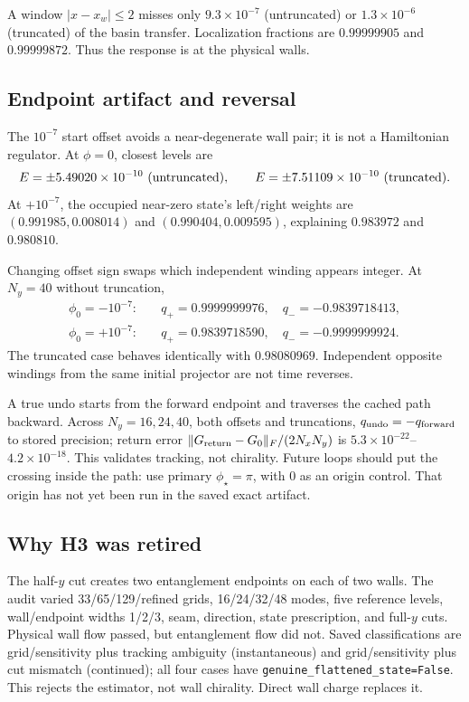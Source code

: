 \documentclass[aps,prb,onecolumn,nofootinbib,superscriptaddress]{revtex4-2}
\newcommand{\code}[1]{\texttt{#1}}
\begin{document}
A window $|x-x_w|\le2$ misses only $9.3\times10^{-7}$ (untruncated) or
$1.3\times10^{-6}$ (truncated) of the basin transfer.  Localization fractions
are $0.99999905$ and $0.99999872$.  Thus the response is at the physical walls.

\subsection{Endpoint artifact and reversal}

The $10^{-7}$ start offset avoids a near-degenerate wall pair; it is not a
Hamiltonian regulator.  At $\phi=0$, closest levels are
\begin{equation}
 E=\pm5.49020\times10^{-10}\ ({\rm untruncated}),\qquad
 E=\pm7.51109\times10^{-10}\ ({\rm truncated}).
\end{equation}
At $+10^{-7}$, the occupied near-zero state's left/right weights are
$(0.991985,0.008014)$ and $(0.990404,0.009595)$, explaining $0.983972$ and
$0.980810$.

Changing offset sign swaps which independent winding appears integer.  At
$N_y=40$ without truncation,
\begin{align}
 \phi_0=-10^{-7}:&\quad q_+=0.9999999976,\quad q_-=-0.9839718413,\\
 \phi_0=+10^{-7}:&\quad q_+=0.9839718590,\quad q_-=-0.9999999924.
\end{align}
The truncated case behaves identically with $0.98080969$.  Independent
opposite windings from the same initial projector are not time reverses.

A true undo starts from the forward endpoint and traverses the cached path
backward.  Across $N_y=16,24,40$, both offsets and truncations,
$q_{\rm undo}=-q_{\rm forward}$ to stored precision; return error
$\|G_{\rm return}-G_0\|_F/(2N_xN_y)$ is
$5.3\times10^{-22}$--$4.2\times10^{-18}$.  This validates tracking, not
chirality.  Future loops should put the crossing inside the path: use primary
$\phi_\star=\pi$, with $0$ as an origin control.  That origin has not yet been
run in the saved exact artifact.

\subsection{Why H3 was retired}

The half-$y$ cut creates two entanglement endpoints on each of two walls.  The
audit varied 33/65/129/refined grids, 16/24/32/48 modes, five reference levels,
wall/endpoint widths 1/2/3, seam, direction, state prescription, and full-$y$
cuts.  Physical wall flow passed, but entanglement flow did not.  Saved
classifications are grid/sensitivity plus tracking ambiguity (instantaneous)
and grid/sensitivity plus cut mismatch (continued); all four cases have
\code{genuine\_flattened\_state=False}.  This rejects the estimator, not wall
chirality.  Direct wall charge replaces it.
\end{document}
